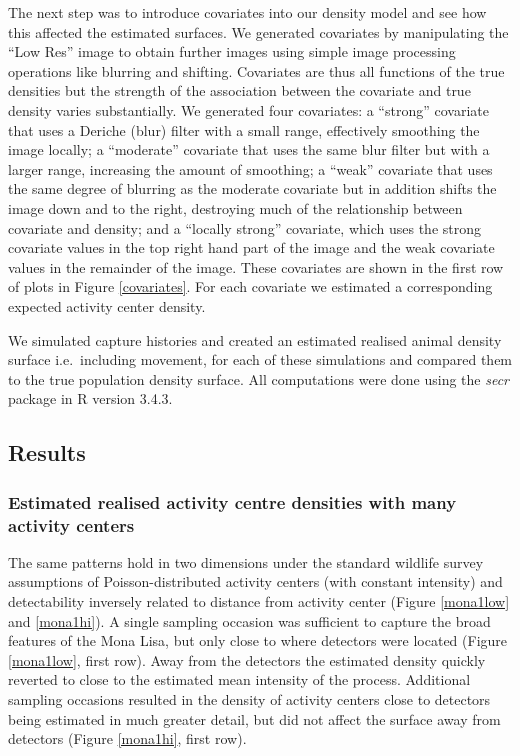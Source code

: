 \documentclass[10pt,a4paper]{article}
\begin{document}
The next step was to introduce covariates into our density model and see how this affected the estimated surfaces. We generated covariates by manipulating the ``Low Res'' image to obtain further images using simple image processing operations like blurring and shifting. Covariates are thus all functions of the true densities but the strength of the association between the covariate and true density varies substantially. We generated four covariates: a ``strong'' covariate that uses a Deriche (blur) filter with a small range, effectively smoothing the image locally; a ``moderate'' covariate that uses the same blur filter but with a larger range, increasing the amount of smoothing; a ``weak'' covariate that uses the same degree of blurring as the moderate covariate but in addition shifts the image down and to the right, destroying much of the relationship between covariate and density; and a ``locally strong'' covariate, which uses the strong covariate values in the top right hand part of the image and the weak covariate values in the remainder of the image. These covariates are shown in the first row of plots in Figure \ref{covariates}. For each covariate we estimated a corresponding expected activity center density.

We simulated capture histories and created an estimated realised animal density surface i.e.\ including movement, for each of these simulations and compared them to the true population density surface. All computations were done using the {\it secr} package in R version 3.4.3. 

\subsection{Results}

\subsubsection{Estimated realised activity centre densities with many activity centers}

The same patterns hold in two dimensions under the standard wildlife survey assumptions of Poisson-distributed activity centers (with constant intensity) and detectability inversely related to distance from activity center (Figure \ref{mona1low} and \ref{mona1hi}). A single sampling occasion was sufficient to capture the broad features of the Mona Lisa, but only close to where detectors were located (Figure \ref{mona1low}, first row). Away from the detectors the estimated density quickly reverted to close to the estimated mean intensity of the process. Additional sampling occasions resulted in the density of activity centers close to detectors being estimated in much greater detail, but did not affect the surface away from detectors (Figure \ref{mona1hi}, first row). 
\end{document}
